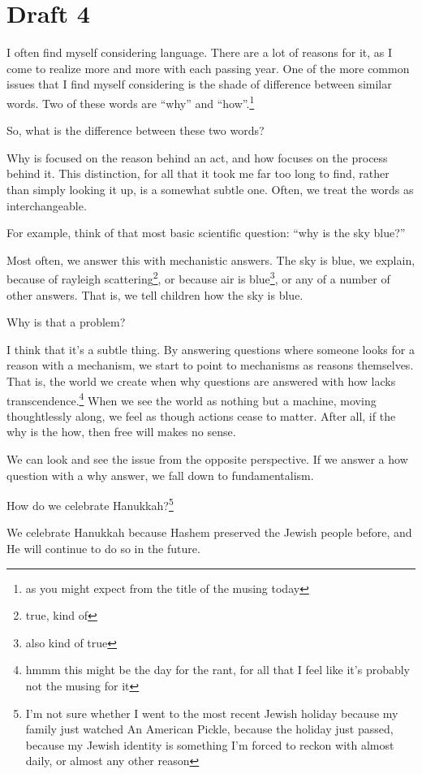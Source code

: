 \documentclass[12pt]{article}[titlepage]
\newcommand{\say}[1]{``#1''}
\renewcommand{\,}{\textsuperscript{,}}
\begin{document}
\section{Draft 4}
I often find myself considering language.
There are a lot of reasons for it, as I come to realize more and more with each passing year.
One of the more common issues that I find myself considering is the shade of difference between similar words.
Two of these words are \say{why} and \say{how}.\footnote{as you might expect from the title of the musing today}

So, what is the difference between these two words?

Why is focused on the reason behind an act, and how focuses on the process behind it.
This distinction, for all that it took me far too long to find, rather than simply looking it up, is a somewhat subtle one.
Often, we treat the words as interchangeable.

For example, think of that most basic scientific question: \say{why is the sky blue?}

Most often, we answer this with mechanistic answers.
The sky is blue, we explain, because of rayleigh scattering\footnote{true, kind of}, or because air is blue\footnote{also kind of true}, or any of a number of other answers.
That is, we tell children how the sky is blue.

Why is that a problem?

I think that it's a subtle thing.
By answering questions where someone looks for a reason with a mechanism, we start to point to mechanisms as reasons themselves.
That is, the world we create when why questions are answered with how lacks transcendence.\footnote{hmmm this might be the day for the rant, for all that I feel like it's probably not the musing for it}
When we see the world as nothing but a machine, moving thoughtlessly along, we feel as though actions cease to matter.
After all, if the why is the how, then free will makes no sense.

We can look and see the issue from the opposite perspective.
If we answer a how question with a why answer, we fall down to fundamentalism.

How do we celebrate Hanukkah?\footnote{I'm not sure whether I went to the most recent Jewish holiday because my family just watched An American Pickle, because the holiday just passed, because my Jewish identity is something I'm forced to reckon with almost daily, or almost any other reason}

We celebrate Hanukkah because Hashem preserved the Jewish people before, and He will continue to do so in the future.
\end{document}
